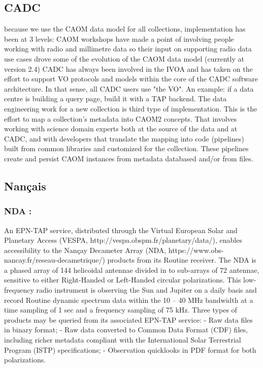 \documentclass[11pt,a4paper]{ivoa}
\begin{document}
\subsection{CADC}
\label{sec:CADC}
because we use the CAOM data model for all collections, implementation has been at 3 levels:
CAOM workshops have made a point of involving people working with radio and millimetre data so their input on supporting radio data use cases drove some of the evolution of the CAOM data model (currently at version 2.4)
CADC has always been involved in the IVOA and has taken on the effort to support VO protocols and models within the core of the CADC software architecture. In that sense, all CADC users use "the VO".  An example: if a data centre is building a query page, build it with a TAP backend.
The data engineering work for a new collection is third type of implementation. This is the effort to map a collection's metadata into CAOM2 concepts. That involves working with science domain experts both at the source of the data and at CADC, and with developers that translate the mapping into code (pipelines) built from common libraries and customized for the collection. These pipelines create and persist CAOM instances from metadata databased and/or from files.

\subsection{Nançais}
\label{sec:Nancay}

\subsubsection{NDA :}

An EPN-TAP service, distributed through the Virtual European Solar and Planetary Access (VESPA, http://vespa.obspm.fr/planetary/data/), enables accessibility to the Nançay Decameter Array (NDA, https://www.obs-nancay.fr/reseau-decametrique/) products from its Routine receiver. The NDA is a phased array of 144 helicoidal antennae divided in to sub-arrays of 72 antennae, sensitive to either Right-Handed or Left-Handed circular polarizations. This low-frequency radio instrument is observing the Sun and Jupiter on a daily basis and record Routine dynamic spectrum data within the 10 – 40 MHz bandwidth at a time sampling of 1 sec and a frequency sampling of 75 kHz. Three types of products may be queried from its associated EPN-TAP service:
- Raw data files in binary format;
- Raw data converted to Common Data Format (CDF) files, including richer metadata compliant with the International Solar Terrestrial Program (ISTP) specifications;
- Observation quicklooks in PDF format for both polarizations.
\end{document}
